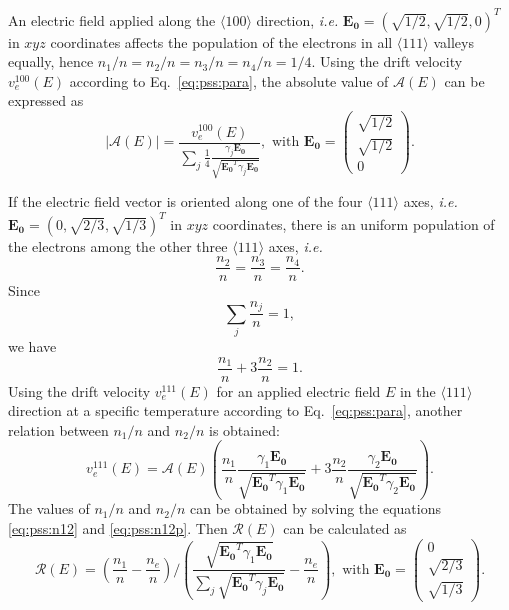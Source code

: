 An electric field applied along the $\langle 100 \rangle$ direction,
\textit{i.e.} $\mathbf{E_{0}} = (\sqrt{1/2}, \sqrt{1/2}, 0)^{T}$ in
$xyz$ coordinates affects the population of the electrons in all
$\langle 111 \rangle$ valleys equally, hence $n_{1}/n = n_{2}/n =
n_{3}/n = n_{4}/n = 1/4$. Using the drift velocity $v_{e}^{100}(E)$
according to Eq.~\ref{eq:pss:para}, the absolute value of
$\mathcal{A}(E)$ can be expressed as
\begin{equation} 
\label{eq:pss:ae} 
|\mathcal{A}(E)| = \frac{v_{e}^{100}(E)}  
{\displaystyle \sum_{j} \frac{1}{4} \frac{\gamma_{j}\mathbf{E_{0}}}
{\sqrt{\mathbf{E_{0}}^{T}\gamma_{j}\mathbf{E_{0}}}}}, \mbox{ with } 
\mathbf{E_{0}} = \left( \begin{array}{c}  
\sqrt{1/2}\\\sqrt{1/2}\\0 \end{array} \right). 
\end{equation} 
 
If the electric field vector is oriented along one of the four
$\langle 111 \rangle$ axes, \textit{i.e.} $\mathbf{E_{0}} = (0,
\sqrt{2/3}, \sqrt{1/3})^{T}$ in $xyz$ coordinates, there is an uniform
population of the electrons among the other three $\langle 111
\rangle$ axes, \textit{i.e.}
\begin{equation} 
\label{eq:pss:n111} 
\frac{n_{2}}{n} = \frac{n_{3}}{n} = \frac{n_{4}}{n}. 
\end{equation} 
Since 
\begin{equation} 
\label{eq:pss:nsum} 
\displaystyle \sum_{j}\frac{n_{j}}{n} = 1, 
\end{equation} 
we have 
\begin{equation} 
\label{eq:pss:n12} 
\frac{n_{1}}{n} + 3\frac{n_{2}}{n}= 1. 
\end{equation} 
Using the drift velocity $v_{e}^{111}(E)$ for an applied electric
field $E$ in the $\langle 111 \rangle$ direction at a specific
temperature according to Eq.~\ref{eq:pss:para}, another relation
between $n_{1}/n$ and $n_{2}/n$ is obtained:
\begin{equation} 
\label{eq:pss:n12p} 
v_{e}^{111}(E) =  \mathcal{A}(E) 
\left( \frac{n_{1}}{n} \frac{\gamma_{1}\mathbf{E_{0}}} 
{\sqrt{\mathbf{E_{0}}^{T}\gamma_{1}\mathbf{E_{0}}}} +  
3\frac{n_{2}}{n} \frac{\gamma_{2}\mathbf{E_{0}}}         
{\sqrt{\mathbf{E_{0}}^{T}\gamma_{2}\mathbf{E_{0}}}} \right). 
\end{equation} 
The values of $n_{1}/n$ and $n_{2}/n$ can be obtained by solving the
equations \ref{eq:pss:n12} and \ref{eq:pss:n12p}. Then
$\mathcal{R}(E)$ can be calculated as
\begin{equation} 
\label{eq:pss:re} 
\mathcal{R}(E) = \left( \frac{n_{1}}{n} - \frac{n_{e}}{n} \right) / 
\left( \frac{\sqrt{\mathbf{E_{0}}^{T}\gamma_{1}\mathbf{E_{0}}}} 
{\sum_{j}\sqrt{\mathbf{E_{0}}^{T}\gamma_{j}\mathbf{E_{0}}}} - 
\frac{n_{e}}{n} \right), \mbox{ with } 
\mathbf{E_{0}} = \left( \begin{array}{c}  
0\\ \sqrt{2/3}\\\sqrt{1/3} \end{array} \right). 
\end{equation} 
 
